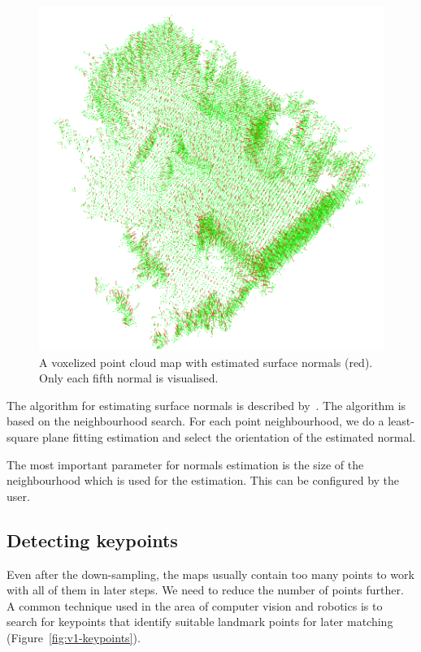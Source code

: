 \begin{figure}
    \centering
    \includegraphics[width=\textwidth]{../img/v1-normals.png}
    \caption[A point cloud map with estimated surface normals]{A voxelized point cloud map with estimated surface normals (red). Only each fifth normal is visualised.}
    \label{fig:v1-normals}
\end{figure}

The algorithm for estimating surface normals is described by~\citet{RusuDoctoralDissertation}. The algorithm is based on the neighbourhood search. For each point neighbourhood, we do a least-square plane fitting estimation and select the orientation of the estimated normal.

The most important parameter for normals estimation is the size of the neighbourhood which is used for the estimation. This can be configured by the user.

\subsection{Detecting keypoints}
\label{sec:detect-keypoints}

Even after the down-sampling, the maps usually contain too many points to work with all of them in later steps. We need to reduce the number of points further. A common technique used in the area of computer vision and robotics is to search for keypoints that identify suitable landmark points for later matching (Figure~\ref{fig:v1-keypoints}).

